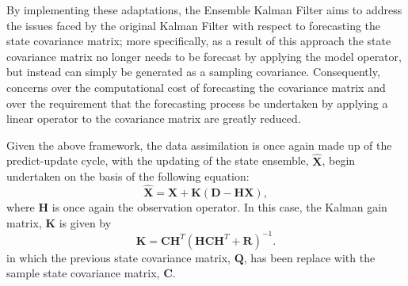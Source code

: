 By implementing these adaptations, the Ensemble Kalman Filter aims to address
the issues faced by the original Kalman Filter with respect to forecasting the
state covariance matrix; more specifically, as a result of this approach the
state covariance matrix no longer needs to be forecast by applying the model
operator, but instead can simply be generated as a sampling covariance.
Consequently, concerns over the computational cost of forecasting the covariance
matrix and over the requirement that the forecasting process be undertaken by
applying a linear operator to the covariance matrix are greatly reduced.

Given the above framework, the data assimilation is once again made up of the
predict-update cycle, with the updating of the state ensemble,
$\hat{\mathbf{X}}$, begin undertaken on the basis of the following equation: 
\begin{equation}
    \hat{\mathbf{X}} = \mathbf{X} + \mathbf{K}
                        \left(
                        \mathbf{D} - \mathbf{H} \mathbf{X}
                        \right),
\end{equation}
where $\mathbf{H}$ is once again the observation operator. 
In this case, the Kalman gain matrix, $\mathbf{K}$ is given by
\begin{equation}
    \mathbf{K} = \mathbf{C} \mathbf{H}^T
                     {\left(
                     \mathbf{H} \mathbf{C} \mathbf{H}^T
                     + \mathbf{R}
                     \right)} ^ {-1}.
\end{equation}
in which the previous state covariance matrix, $\mathbf{Q}$, has been replace
with the sample state covariance matrix, $\mathbf{C}$.

